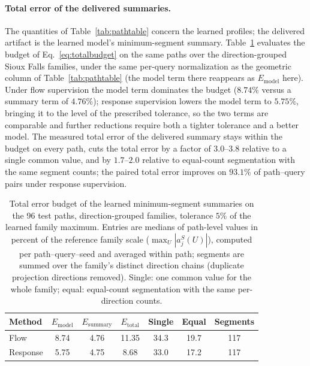 \paragraph{Total error of the delivered summaries.}
The quantities of Table~\ref{tab:pathtable} concern the learned
profiles; the delivered artifact is the learned model's minimum-segment
summary. Table~\ref{tab:totalerror} evaluates the budget of
Eq.~\eqref{eq:totalbudget} on the same paths over the direction-grouped
Sioux Falls families, under the same per-query normalization as the
geometric column of Table~\ref{tab:pathtable} (the model term there
reappears as $E_{\mathrm{model}}$ here). Under flow supervision the
model term dominates the budget ($8.74\%$ versus a summary term of
$4.76\%$); response supervision lowers the model term to $5.75\%$,
bringing it to the level of the prescribed tolerance, so the two terms
are comparable and further reductions require both a tighter tolerance
and a better model. The measured total error of the delivered summary
stays within the budget on every path, cuts the total error by a
factor of $3.0$--$3.8$ relative to a single common value, and by
$1.7$--$2.0$ relative to equal-count segmentation with the same
segment counts; the paired total error improves on $93.1\%$ of
path--query pairs under response supervision.
\begin{table}[t]\centering\footnotesize
\caption{Total error budget of the learned minimum-segment summaries on
the 96 test paths, direction-grouped families, tolerance $5\%$ of the
learned family maximum. Entries are medians of path-level values in
percent of the reference family scale ($\max_U|a^S_j(U)|$), computed
per path--query--seed and averaged within path; segments are summed
over the family's distinct direction chains (duplicate projection
directions removed). Single: one common value for the whole family;
equal: equal-count segmentation with the same per-direction
counts.}\label{tab:totalerror}
\setlength{\tabcolsep}{4.5pt}
\begin{tabular*}{\tblwidth}{@{\extracolsep{\fill}}lcccccc}
\toprule
Method & $E_{\mathrm{model}}$ & $E_{\mathrm{summary}}$ & $E_{\mathrm{total}}$ & Single & Equal & Segments\\
\midrule
Flow & 8.74 & 4.76 & 11.35 & 34.3 & 19.7 & 117\\
Response & 5.75 & 4.75 & 8.68 & 33.0 & 17.2 & 117\\
\bottomrule\end{tabular*}\end{table}

